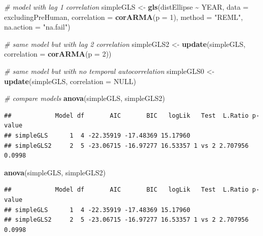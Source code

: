 \documentclass[nofonts,]{tufte-handout}
\newenvironment{Shaded}{\begin{snugshade}}{\end{snugshade}}
\newcommand{\AttributeTok}[1]{\textcolor[rgb]{0.13,0.29,0.53}{#1}}
\newcommand{\CommentTok}[1]{\textcolor[rgb]{0.56,0.35,0.01}{\textit{#1}}}
\newcommand{\ConstantTok}[1]{\textcolor[rgb]{0.56,0.35,0.01}{#1}}
\newcommand{\DecValTok}[1]{\textcolor[rgb]{0.00,0.00,0.81}{#1}}
\newcommand{\FunctionTok}[1]{\textcolor[rgb]{0.13,0.29,0.53}{\textbf{#1}}}
\newcommand{\NormalTok}[1]{#1}
\newcommand{\OtherTok}[1]{\textcolor[rgb]{0.56,0.35,0.01}{#1}}
\newcommand{\SpecialCharTok}[1]{\textcolor[rgb]{0.81,0.36,0.00}{\textbf{#1}}}
\newcommand{\StringTok}[1]{\textcolor[rgb]{0.31,0.60,0.02}{#1}}
\begin{document}
\begin{Shaded}
\begin{Highlighting}[]
\CommentTok{\# model with lag 1 correlation}
\NormalTok{simpleGLS }\OtherTok{\textless{}{-}} \FunctionTok{gls}\NormalTok{(distEllipse }\SpecialCharTok{\textasciitilde{}}\NormalTok{ YEAR,}
                           \AttributeTok{data =}\NormalTok{ excludingPreHuman,}
                 \AttributeTok{correlation =} \FunctionTok{corARMA}\NormalTok{(}\AttributeTok{p =} \DecValTok{1}\NormalTok{),}
                  \AttributeTok{method =} \StringTok{"REML"}\NormalTok{,}
                 \AttributeTok{na.action =} \StringTok{"na.fail"}\NormalTok{)}


\CommentTok{\# same model but with lag 2 correlation}
\NormalTok{simpleGLS2 }\OtherTok{\textless{}{-}} \FunctionTok{update}\NormalTok{(simpleGLS, }
                     \AttributeTok{correlation =} \FunctionTok{corARMA}\NormalTok{(}\AttributeTok{p =} \DecValTok{2}\NormalTok{))}

\CommentTok{\# same model but with no temporal autocorrelation}
\NormalTok{simpleGLS0 }\OtherTok{\textless{}{-}} \FunctionTok{update}\NormalTok{(simpleGLS, }
                     \AttributeTok{correlation =} \ConstantTok{NULL}\NormalTok{)}

\CommentTok{\# compare models}
\FunctionTok{anova}\NormalTok{(simpleGLS, simpleGLS2)}
\end{Highlighting}
\end{Shaded}

\begin{verbatim}
##            Model df       AIC       BIC   logLik   Test  L.Ratio p-value
## simpleGLS      1  4 -22.35919 -17.48369 15.17960                        
## simpleGLS2     2  5 -23.06715 -16.97277 16.53357 1 vs 2 2.707956  0.0998
\end{verbatim}

\begin{Shaded}
\begin{Highlighting}[]
\FunctionTok{anova}\NormalTok{(simpleGLS, simpleGLS2)}
\end{Highlighting}
\end{Shaded}

\begin{verbatim}
##            Model df       AIC       BIC   logLik   Test  L.Ratio p-value
## simpleGLS      1  4 -22.35919 -17.48369 15.17960                        
## simpleGLS2     2  5 -23.06715 -16.97277 16.53357 1 vs 2 2.707956  0.0998
\end{verbatim}
\end{document}
